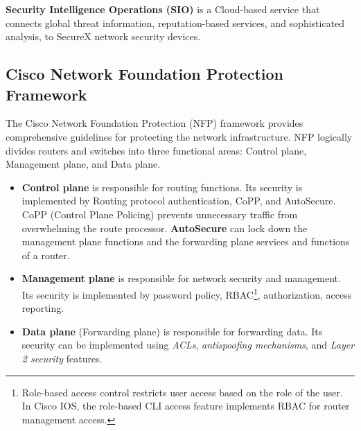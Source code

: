 \textbf{Security Intelligence Operations (SIO)} is a Cloud-based service that connects global threat information, reputation-based services, and sophisticated analysis, to SecureX network security devices.

\subsection{Cisco Network Foundation Protection Framework}

The Cisco Network Foundation Protection (NFP) framework provides comprehensive guidelines for protecting the network infrastructure.  NFP logically divides routers and switches into three functional areas: Control plane, Management plane, and Data plane.\\

\begin{itemize}

\item\textbf{Control plane} is responsible for routing functions. Its security is implemented by Routing protocol authentication, CoPP, and AutoSecure. CoPP (Control Plane Policing) prevents unnecessary traffic from overwhelming the route processor. \textbf{AutoSecure} can lock down the management plane functions and the forwarding plane services and functions of a router.\\

\item\textbf{Management plane} is responsible for network security and management. Its security is implemented by password policy, RBAC\footnote{Role-based access control  restricts user access based on the role of the user. In Cisco IOS, the role-based CLI access feature implements RBAC for router management access.}, authorization, access reporting.

\item\textbf{Data plane} (Forwarding plane) is responsible for forwarding data. Its security can be implemented using \emph{ACLs}, \emph{antispoofing mechanisms}, and \emph{Layer 2 security} features. 

\end{itemize}
